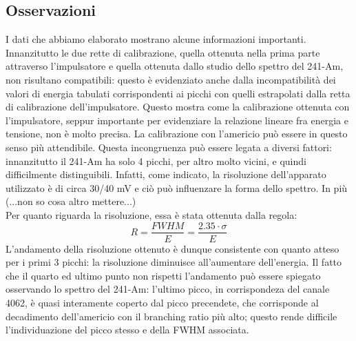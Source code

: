 \documentclass[a4paper,10pt]{article}
\begin{document}
\subsection{Osservazioni}
I dati che abbiamo elaborato mostrano alcune informazioni importanti. Innanzitutto le due rette di calibrazione, quella ottenuta nella prima parte attraverso l'impulsatore e quella ottenuta dallo studio dello spettro del 241-Am, non risultano compatibili: questo è evidenziato anche dalla incompatibilità dei valori di energia tabulati corrispondenti ai picchi con quelli estrapolati dalla retta di calibrazione dell'impulsatore. Questo mostra come la calibrazione ottenuta con l'impulsatore, seppur importante per evidenziare la relazione lineare fra energia e tensione, non è molto precisa. La calibrazione con l'americio può essere in questo senso più attendibile. Questa incongruenza può essere legata a diversi fattori: innanzitutto il 241-Am ha solo 4 picchi, per altro molto vicini, e quindi difficilmente distinguibili. Infatti, come indicato, la risoluzione dell'apparato utilizzato è di circa 30/40 mV e ciò può influenzare la forma dello spettro. In più (...non so cosa altro mettere...)\\
Per quanto riguarda la risoluzione, essa è stata ottenuta dalla regola:
\[
R=\frac{FWHM}{E}=\frac{2.35\cdot\sigma}{E}
\]
L'andamento della risoluzione ottenuto è dunque consistente con quanto atteso per i primi 3 picchi: la risoluzione diminuisce all'aumentare dell'energia. Il fatto che il quarto ed ultimo punto non rispetti l'andamento può essere spiegato osservando lo spettro del 241-Am: l'ultimo picco, in corrispondeza del canale 4062, è quasi interamente coperto dal picco precendete, che corrisponde al decadimento dell'americio con il branching ratio più alto; questo rende difficile l'individuazione del picco stesso e della FWHM associata. 
\end{document}
